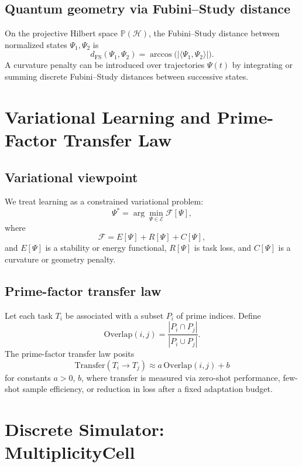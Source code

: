\documentclass[11pt]{article}
\begin{document}
\subsection{Quantum geometry via Fubini--Study distance}

On the projective Hilbert space $\mathbb{P}(\mathcal{H})$, the Fubini--Study distance between normalized states $\Psi_1,\Psi_2$ is
\[
d_{\mathrm{FS}}(\Psi_1,\Psi_2)
=
\arccos\big(|\langle \Psi_1,\Psi_2\rangle|\big).
\]
A curvature penalty can be introduced over trajectories $\Psi(t)$ by integrating or summing discrete Fubini--Study distances between successive states.

\section{Variational Learning and Prime-Factor Transfer Law}

\subsection{Variational viewpoint}

We treat learning as a constrained variational problem:
\begin{equation}
\Psi^\ast = \arg\min_{\Psi \in \mathcal{E}} \mathcal{F}[\Psi],
\end{equation}
where
\begin{equation}
\mathcal{F} = E[\Psi] + R[\Psi] + C[\Psi],
\end{equation}
and $E[\Psi]$ is a stability or energy functional, $R[\Psi]$ is task loss, and $C[\Psi]$ is a curvature or geometry penalty.

\subsection{Prime-factor transfer law}

Let each task $T_i$ be associated with a subset $P_i$ of prime indices. Define
\[
\mathrm{Overlap}(i,j) = \frac{|P_i\cap P_j|}{|P_i\cup P_j|}.
\]
The prime-factor transfer law posits
\begin{equation}
\mathrm{Transfer}(T_i\to T_j)
\approx
a\,\mathrm{Overlap}(i,j) + b
\end{equation}
for constants $a>0$, $b$, where transfer is measured via zero-shot performance, few-shot sample efficiency, or reduction in loss after a fixed adaptation budget.

\section{Discrete Simulator: MultiplicityCell}
\end{document}

